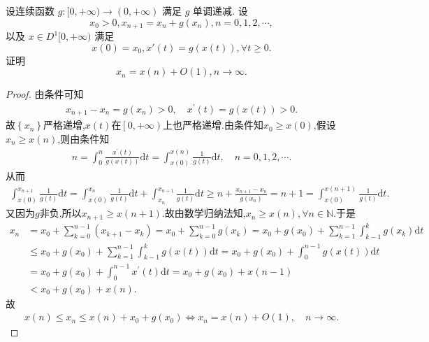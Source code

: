 \documentclass[../../main.tex]{subfiles}
\begin{document}
\begin{example}
设连续函数 $g:[0,+\infty)\to(0,+\infty)$ 满足 $g$ 单调递减. 设
\[
x_0>0, x_{n+1}=x_n+g(x_n), n=0,1,2,\cdots,
\]
以及 $x\in D^1[0,+\infty)$ 满足
\[
x(0)=x_0 ,x'(t)=g(x(t)), \forall t\geqslant0.
\]
证明
\[
x_n=x(n)+O(1), n\to\infty.
\]
\end{example}
\begin{proof}
由条件可知
\begin{align*}
x_{n+1}-x_n=g\left( x_n \right) >0,\quad x^\prime \left( t \right) =g\left( x\left( t \right) \right) >0.
\end{align*}
故$\left\{ x_n \right\}$严格递增,$x\left( t \right)$在$\left[ 0,+\infty \right)$上也严格递增.由条件知$x_0\geqslant x\left( 0 \right)$,假设$x_n\geqslant x\left( n \right)$,则由条件知
\begin{align*}
n=\int_0^n{\frac{x^\prime \left( t \right)}{g\left( x(t) \right)}\mathrm{d}t}=\int_{x\left( 0 \right)}^{x\left( n \right)}{\frac{1}{g\left( t \right)}\mathrm{d}t},\quad n=0,1,2,\cdots .
\end{align*}
从而
\begin{align*}
\int_{x\left( 0 \right)}^{x_{n+1}}{\frac{1}{g\left( t \right)}\mathrm{d}t}=\int_{x\left( 0 \right)}^{x_n}{\frac{1}{g\left( t \right)}\mathrm{d}t}+\int_{x_n}^{x_{n+1}}{\frac{1}{g\left( t \right)}\mathrm{d}t}\geqslant n+\frac{x_{n+1}-x_n}{g\left( x_n \right)}=n+1=\int_{x\left( 0 \right)}^{x\left( n+1 \right)}{\frac{1}{g\left( t \right)}\mathrm{d}t}.
\end{align*}
又因为$g$非负,所以$x_{n+1}\geqslant x\left( n+1 \right)$.故由数学归纳法知,$x_n\geqslant x\left( n \right),\forall n\in \mathbb{N}$.于是
\begin{align*}
x_n&=x_0+\sum_{k=0}^{n-1}{\left( x_{k+1}-x_k \right)}=x_0+\sum_{k=0}^{n-1}{g\left( x_k \right)}=x_0+g\left( x_0 \right) +\sum_{k=1}^{n-1}{\int_{k-1}^k{g\left( x_k \right) \mathrm{d}t}}
\\
&\leqslant x_0+g\left( x_0 \right) +\sum_{k=1}^{n-1}{\int_{k-1}^k{g\left( x\left( t \right) \right) \mathrm{d}t}}=x_0+g\left( x_0 \right) +\int_0^{n-1}{g\left( x\left( t \right) \right) \mathrm{d}t}
\\
&=x_0+g\left( x_0 \right) +\int_0^{n-1}{x^\prime \left( t \right) \mathrm{d}t}=x_0+g\left( x_0 \right) +x\left( n-1 \right) 
\\
&<x_0+g\left( x_0 \right) +x\left( n \right) .
\end{align*}
故
\begin{align*}
x\left( n \right) \leqslant x_n\leqslant x\left( n \right) +x_0+g\left( x_0 \right) \Longleftrightarrow x_n=x\left( n \right) +O\left( 1 \right) ,\quad n\rightarrow \infty .
\end{align*}

\end{proof}
\end{document}
